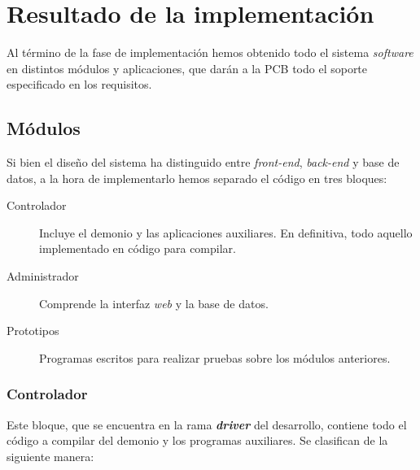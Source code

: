 \newpage

\section{Resultado de la implementación}

Al término de la fase de implementación hemos obtenido todo el sistema \textit{software} en distintos módulos y aplicaciones, que darán a la \acrshort{PCB} todo el soporte especificado en los requisitos.

\subsection{Módulos}

Si bien el diseño del sistema ha distinguido entre \textit{front-end}, \textit{back-end} y base de datos, a la hora de implementarlo hemos separado el código en tres bloques:

\begin{description}
	\item[Controlador] Incluye el demonio y las aplicaciones auxiliares. En definitiva, todo aquello implementado en código para compilar.
	\item[Administrador] Comprende la interfaz \textit{web} y la base de datos.
	\item[Prototipos] Programas escritos para realizar pruebas sobre los módulos anteriores.
\end{description}

\subsubsection{Controlador}

Este bloque, que se encuentra en la rama \textbf{\textit{driver}} del desarrollo, contiene todo el código a compilar del demonio y los programas auxiliares. Se clasifican de la siguiente manera:

\smallskip

